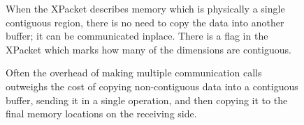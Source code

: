 \begin{enumerate}
\begin{center}
\begin{figure}
\caption{When the XPacket describes memory which is physically
a single contiguous region, there is no need to copy the data
into another buffer; it can be communicated inplace.  There is
a flag in the XPacket which marks how many of the dimensions
are contiguous.}
\label{fig:xpacketcontig}
\end{figure}
\end{center}

\begin{center}
\begin{figure}
\caption{Often the overhead of making multiple communication calls 
outweighs the cost of copying non-contiguous data into a contiguous buffer,
sending it in a single operation, and then copying it to the final
memory locations on the receiving side.}
\label{fig:routepack}
\end{figure}
\end{center}


\end{enumerate}

